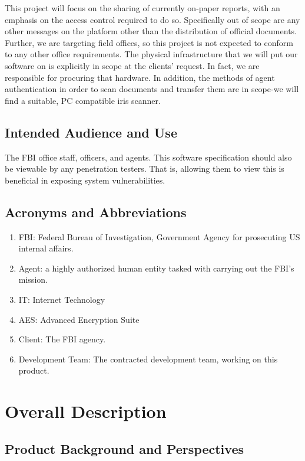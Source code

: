 \documentclass[12pt]{article}
\begin{document}
This project will focus on the sharing of currently on-paper reports, with an emphasis on the access control
required to do so. Specifically out of scope are any other messages on the platform other than the distribution
of official documents. Further, we are targeting field offices, so this project is not expected to conform to
any other office requirements. The physical infrastructure that we will put our software on is explicitly in
scope at the clients’ request. In fact, we are responsible for procuring that hardware. In addition, the methods
of agent authentication in order to scan documents and transfer them are in scope-we will find a suitable, PC
compatible iris scanner.

\subsection{Intended Audience and Use}

The FBI office staff, officers, and agents. This software specification should also be viewable by any penetration
testers. That is, allowing them to view this is beneficial in exposing system vulnerabilities.

\subsection{Acronyms and Abbreviations}

\begin{enumerate}
    \item FBI: Federal Bureau of Investigation, Government Agency for prosecuting US internal affairs.
    \item Agent: a highly authorized human entity tasked with carrying out the FBI's mission.
    \item IT: Internet Technology
    \item AES: Advanced Encryption Suite
    \item Client: The FBI agency.
    \item Development Team: The contracted development team, working on this product.
\end{enumerate}

\section{Overall Description}

\subsection{Product Background and Perspectives}
\end{document}
